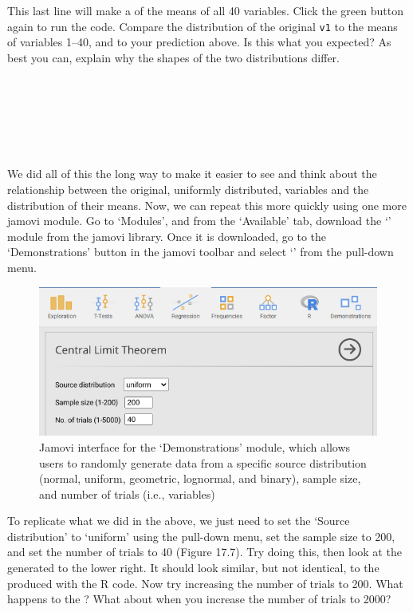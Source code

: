 \documentclass[
  openany]{krantz}
\begin{document}
This last line will make a  of the means of all 40 variables.
Click the green button again to run the code.
Compare the distribution of the original \texttt{v1} to the means of variables 1--40, and to your prediction above.
Is this what you expected?
As best you can, explain why the shapes of the two distributions differ.

\begin{verbatim}






\end{verbatim}

We did all of this the long way to make it easier to see and think about the relationship between the original, uniformly distributed, variables and the distribution of their means.
Now, we can repeat this more quickly using one more jamovi module.
Go to `Modules', and from the `Available' tab, download the `' module from the jamovi library.
Once it is downloaded, go to the `Demonstrations' button in the jamovi toolbar and select `' from the pull-down menu.

\begin{figure}
\includegraphics[width=1\linewidth]{img/jamovi_clt} \caption{Jamovi interface for the `Demonstrations' module, which allows users to randomly generate data from a specific source distribution (normal, uniform, geometric, lognormal, and binary), sample size, and number of trials (i.e., variables)}\label{fig:unnamed-chunk-75}
\end{figure}

\newpage

To replicate what we did in the  above, we just need to set the `Source distribution' to `uniform' using the pull-down menu, set the sample size to 200, and set the number of trials to 40 (Figure 17.7).
Try doing this, then look at the  generated to the lower right.
It should look similar, but not identical, to the  produced with the R code.
Now try increasing the number of trials to 200.
What happens to the ?
What about when you increase the number of trials to 2000?
\end{document}
